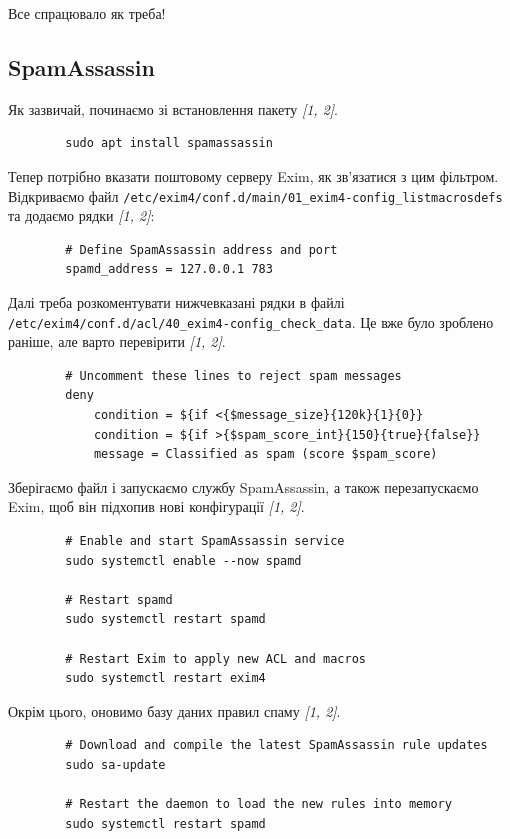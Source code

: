 \documentclass[14pt, a4paper]{extreport}
\begin{document}
	Все спрацювало як треба!
	
	
	\subsection*{SpamAssassin}
	
	Як зазвичай, починаємо зі встановлення пакету \textit{[1, 2]}.
	
	\begin{verbatim}
		sudo apt install spamassassin
	\end{verbatim}
	
	Тепер потрібно вказати поштовому серверу Exim, як зв'язатися з цим фільтром. Відкриваємо файл \texttt{/etc/exim4/conf.d/main/01\_exim4-config\_listmacrosdefs} та додаємо рядки \textit{[1, 2]}:
	
	\begin{verbatim}
		# Define SpamAssassin address and port
		spamd_address = 127.0.0.1 783
	\end{verbatim}
	
	Далі треба розкоментувати нижчевказані рядки в файлі \texttt{/etc/exim4/conf.d/acl/40\_exim4-config\_check\_data}. Це вже було зроблено раніше, але варто перевірити \textit{[1, 2]}.
	
	\begin{verbatim}
		# Uncomment these lines to reject spam messages
		deny
			condition = ${if <{$message_size}{120k}{1}{0}}
			condition = ${if >{$spam_score_int}{150}{true}{false}}
			message = Classified as spam (score $spam_score)
	\end{verbatim}
	
	Зберігаємо файл і запускаємо службу SpamAssassin, а також перезапускаємо Exim, щоб він підхопив нові конфігурації \textit{[1, 2]}.
	
	\begin{verbatim}
		# Enable and start SpamAssassin service
		sudo systemctl enable --now spamd
		
		# Restart spamd
		sudo systemctl restart spamd
		
		# Restart Exim to apply new ACL and macros
		sudo systemctl restart exim4
	\end{verbatim}
	
	Окрім цього, оновимо базу даних правил спаму \textit{[1, 2]}.
	
	\begin{verbatim}
		# Download and compile the latest SpamAssassin rule updates
		sudo sa-update
		
		# Restart the daemon to load the new rules into memory
		sudo systemctl restart spamd
	\end{verbatim}
	
\end{document}
